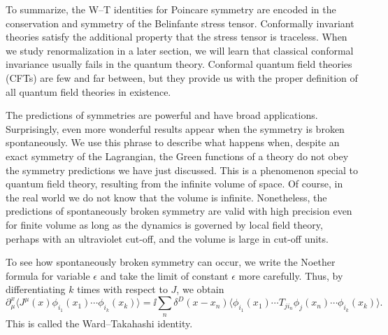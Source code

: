To summarize, the W--T identities for Poincare symmetry are encoded in the
conservation and symmetry of the Belinfante stress tensor. Conformally invariant
theories satisfy the additional property that the stress tensor is traceless.
When we study renormalization in a later section, we will learn that classical
conformal invariance usually fails in the quantum theory. Conformal quantum
field theories (CFTs) are few and far between, but they provide us with the
proper definition of all quantum field theories in existence.

The predictions of symmetries are powerful and have broad applications.
Surprisingly, even more wonderful results appear when the symmetry is broken
spontaneously. We use this phrase to describe what happens when, despite an
exact symmetry of the Lagrangian, the Green functions of a theory do not obey
the symmetry predictions we have just discussed. This is a phenomenon special
to quantum field theory, resulting from the infinite volume of space. Of course,
in the real world we do not know that the volume is infinite. Nonetheless, the
predictions of spontaneously broken symmetry are valid with high precision even
for finite volume as long as the dynamics is governed by local field theory,
perhaps with an ultraviolet cut-off, and the volume is large in cut-off units.

To see how spontaneously broken symmetry can occur, we write the Noether
formula for variable $\epsilon$ and take the limit of constant $\epsilon$ more
carefully. Thus, by differentiating $k$ times with respect to $J$, we obtain
\begin{equation*}
  \partial^x_\mu\langle J^\mu(x)\phi_{i_1}(x_1)\cdots\phi_{i_k}(x_k)\rangle
  =\ii\sum_n\delta^D(x-x_n)\langle\phi_{i_1}(x_1)\cdots
  T_{j i_n}\phi_j(x_n)\cdots\phi_{i_k}(x_k)\rangle.
\end{equation*}
This is called the Ward--Takahashi identity.

